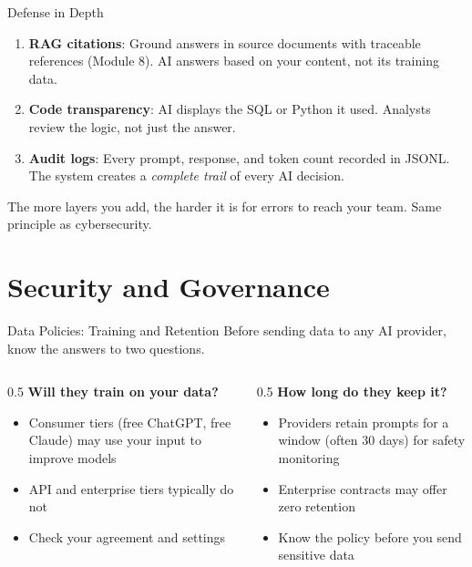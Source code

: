 \documentclass[aspectratio=169]{beamer}
\begin{document}
\begin{frame}{Defense in Depth}
\begin{enumerate}
  \item \textbf{RAG citations}: Ground answers in source documents with traceable references (Module 8). AI answers based on \alert{your content}, not its training data.
  \item \textbf{Code transparency}: AI displays the SQL or Python it used. Analysts review the logic, not just the answer.
  \item \textbf{Audit logs}: Every prompt, response, and token count recorded in JSONL. The system creates a \textit{complete trail} of every AI decision.
\end{enumerate}
\vspace{0.5cm}
The more layers you add, the harder it is for errors to reach your team. \alert{Same principle as cybersecurity.}
\end{frame}

\section{Security and Governance}

\begin{frame}{Data Policies: Training and Retention}
Before sending data to any AI provider, know the answers to two questions.
\vspace{0.3cm}
\begin{columns}[T]
\begin{column}{0.5\textwidth}
\textbf{Will they train on your data?}
\begin{itemize}\small
  \item \alert{Consumer tiers} (free ChatGPT, free Claude) may use your input to improve models
  \item \alert{API and enterprise tiers} typically do not
  \item Check your agreement and settings
\end{itemize}
\end{column}
\begin{column}{0.5\textwidth}
\textbf{How long do they keep it?}
\begin{itemize}\small
  \item Providers retain prompts for a window (often 30 days) for safety monitoring
  \item Enterprise contracts may offer zero retention
  \item Know the policy \alert{before} you send sensitive data
\end{itemize}
\end{column}
\end{columns}
\end{frame}
\end{document}

